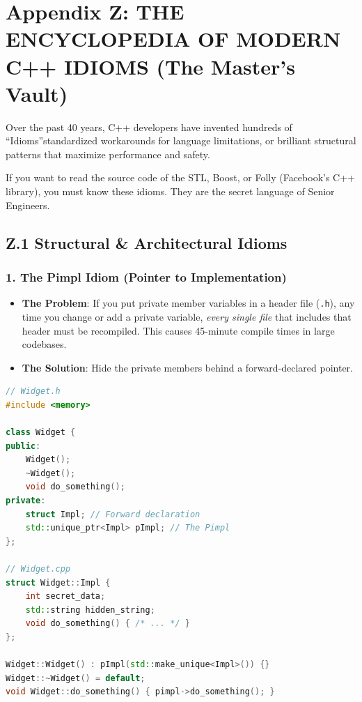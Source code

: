 \hypertarget{appendix-z-the-encyclopedia-of-modern-c-idioms-the-masters-vault}{%
\section{Appendix Z: THE ENCYCLOPEDIA OF MODERN C++ IDIOMS (The Master's
Vault)}\label{appendix-z-the-encyclopedia-of-modern-c-idioms-the-masters-vault}}

Over the past 40 years, C++ developers have invented hundreds of
``Idioms''standardized workarounds for language limitations, or
brilliant structural patterns that maximize performance and safety.

If you want to read the source code of the STL, Boost, or Folly
(Facebook's C++ library), you must know these idioms. They are the
secret language of Senior Engineers.

\hypertarget{z.1-structural-architectural-idioms}{%
\subsection{Z.1 Structural \& Architectural
Idioms}\label{z.1-structural-architectural-idioms}}

\hypertarget{the-pimpl-idiom-pointer-to-implementation}{%
\subsubsection{1. The Pimpl Idiom (Pointer to
Implementation)}\label{the-pimpl-idiom-pointer-to-implementation}}

\begin{itemize}
\tightlist
\item
  \textbf{The Problem}: If you put private member variables in a header
  file (\passthrough{\lstinline!.h!}), any time you change or add a
  private variable, \emph{every single file} that includes that header
  must be recompiled. This causes 45-minute compile times in large
  codebases.
\item
  \textbf{The Solution}: Hide the private members behind a
  forward-declared pointer.
\end{itemize}

\begin{lstlisting}[language={C++}]
// Widget.h
#include <memory>

class Widget {
public:
    Widget();
    ~Widget();
    void do_something();
private:
    struct Impl; // Forward declaration
    std::unique_ptr<Impl> pImpl; // The Pimpl
};

// Widget.cpp
struct Widget::Impl {
    int secret_data;
    std::string hidden_string;
    void do_something() { /* ... */ }
};

Widget::Widget() : pImpl(std::make_unique<Impl>()) {}
Widget::~Widget() = default;
void Widget::do_something() { pimpl->do_something(); }
\end{lstlisting}


